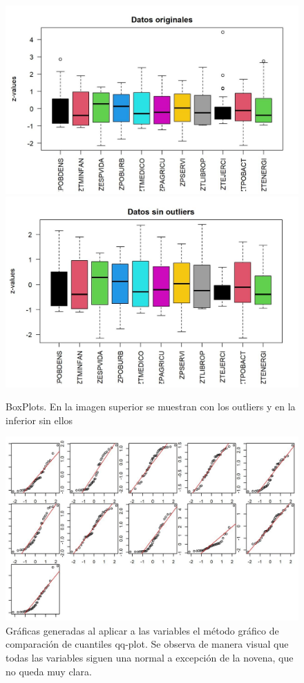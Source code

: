 \documentclass[11pt,a4paper]{article}
\begin{document}
       \begin{figure}[H]
           \centering
           \includegraphics[scale=0.7]{img4.jpg}
           \includegraphics[scale=0.7]{img5.jpg}
           \caption{BoxPlots. En la imagen superior se muestran con los outliers y en la inferior sin ellos}
           \label{fig_1}
       \end{figure}
       
       \begin{figure}[H]
           \centering
           \includegraphics[scale=0.7]{img6.jpg}
           \caption{Gráficas generadas al aplicar a las variables el método gráfico de comparación de cuantiles qq-plot. Se observa de manera visual que todas las variables siguen una normal a excepción de la novena, que no queda muy clara.}
           \label{fig_2}
       \end{figure}
\end{document}
